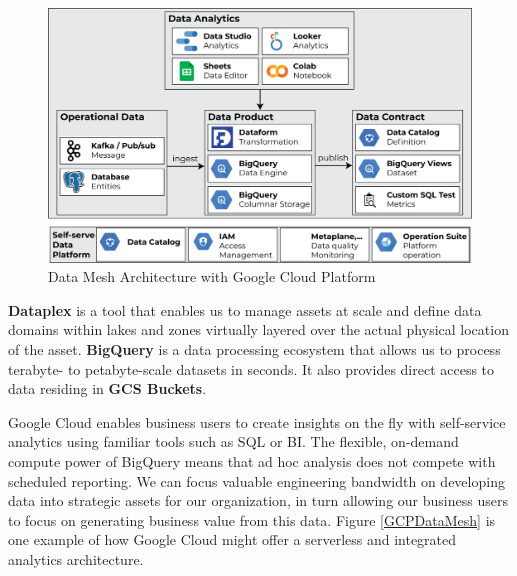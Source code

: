\documentclass[12pt, a4paper]{book}
\begin{document}
\begin{figure}[h]
	\begin{framed}
		\centering
		\includegraphics[width=12cm]{DataMeshGCP.png}
		\caption{Data Mesh Architecture with Google Cloud Platform}
		\label{DataMeshGCP}
	\end{framed}
\end{figure}

\textbf{Dataplex} is a tool that enables us to manage assets at scale and define data domains within lakes and zones virtually layered over the actual physical location of the asset. \textbf{BigQuery} is a data processing ecosystem that allows us to process terabyte- to petabyte-scale datasets in seconds. It also provides direct access to data residing in \textbf{GCS Buckets}. \cite{gcloud}

Google Cloud enables business users to create insights on the fly with self-service analytics using familiar tools such as SQL or BI. The flexible, on-demand compute power of BigQuery means that ad hoc analysis does not compete with scheduled reporting. We can focus valuable engineering bandwidth on developing data into strategic assets for our organization, in turn allowing our business users to focus on generating business value from this data. Figure \ref{GCPDataMesh} is one example of how Google Cloud might offer a serverless and integrated analytics architecture.
\end{document}
